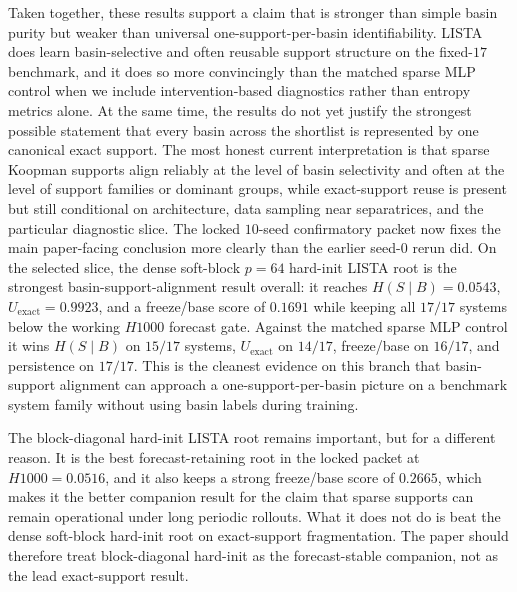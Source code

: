 Taken together, these results support a claim that is stronger than simple
basin purity but weaker than universal one-support-per-basin identifiability.
LISTA does learn basin-selective and often reusable support structure on the
fixed-$17$ benchmark, and it does so more convincingly than the matched sparse
MLP control when we include intervention-based diagnostics rather than entropy
metrics alone. At the same time, the results do not yet justify the strongest
possible statement that every basin across the shortlist is represented by one
canonical exact support. The most honest current interpretation is that sparse
Koopman supports align reliably at the level of basin selectivity and often at
the level of support families or dominant groups, while exact-support reuse is
present but still conditional on architecture, data sampling near
separatrices, and the particular diagnostic slice. The locked $10$-seed
confirmatory packet now fixes the main paper-facing conclusion more clearly
than the earlier seed-$0$ rerun did. On the selected slice, the dense
soft-block $p=64$ hard-init LISTA root is the strongest basin-support-alignment
result overall: it reaches $H(S \mid B)=0.0543$, $U_{\mathrm{exact}}=0.9923$,
and a freeze/base score of $0.1691$ while keeping all $17/17$ systems below the
working $H1000$ forecast gate. Against the matched sparse MLP control it wins
$H(S \mid B)$ on $15/17$ systems, $U_{\mathrm{exact}}$ on $14/17$,
freeze/base on $16/17$, and persistence on $17/17$. This is the
cleanest evidence on this branch that basin-support alignment can approach a
one-support-per-basin picture on a benchmark system family without using basin
labels during training.

The block-diagonal hard-init LISTA root remains important, but for a different
reason. It is the best forecast-retaining root in the locked packet at
$H1000=0.0516$, and it also keeps a strong freeze/base score of
$0.2665$, which makes it the better companion result for the claim that sparse
supports can remain operational under long periodic rollouts. What it does not
do is beat the dense soft-block hard-init root on exact-support fragmentation.
The paper should therefore treat block-diagonal hard-init as the
forecast-stable companion, not as the lead exact-support result.

